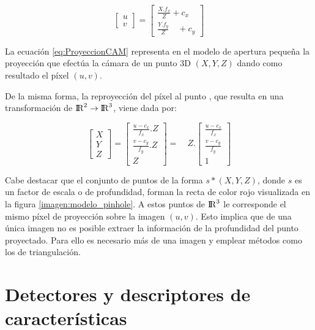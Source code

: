 \begin{equation}
\left[ \begin{matrix} u \\ v \end{matrix} \right] =\left[ \begin{matrix} \frac { X.{ f }_{ x } }{ Z } +{ c }_{ x } \\ \frac { Y.{ f }_{ y } }{ Z } \quad +{ c }_{ y } \end{matrix} \right] 
\label{eq:ProyeccionCAM} 
\end{equation}

La ecuación \ref{eq:ProyeccionCAM} representa en el modelo de apertura pequeña la proyección que efectúa la cámara de un punto 3D $(X, Y, Z)$ dando como resultado el píxel $(u, v)$.

De la misma forma, la reproyección del píxel al punto , que resulta en una transformación de ${\rm I\!R}^2 \to {\rm I\!R}^3$, viene dada por:

\begin{equation}
\left[ \begin{matrix} X \\ Y \\ Z \end{matrix} \right] =\left[ \begin{matrix} \frac { u-{ c }_{ x } }{ { f }_{ x } } .Z \\ \frac { v-{ c }_{ y } }{ { f }_{ y } } .Z \\ Z \end{matrix} \right] =\quad Z.\left[ \begin{matrix} \frac { u-{ c }_{ x } }{ { f }_{ x } }  \\ \frac { v-{ c }_{ y } }{ { f }_{ y } }  \\ 1 \end{matrix} \right]  
\label{eq:ReproyeccionCAM} 
\end{equation}

Cabe destacar que el conjunto de puntos de la forma $s*(X, Y, Z)$, donde $s$ es un factor de escala o de profundidad, forman la recta de color rojo visualizada en la figura \ref{imagen:modelo_pinhole}. A estos puntos de ${\rm I\!R}^3$ le corresponde el mismo píxel de proyección sobre la imagen $(u, v)$. Esto implica que de una única imagen no es posible extraer la información de la profundidad del punto proyectado. Para ello es necesario más de una imagen y emplear métodos como los de triangulación.


%
\section{Detectores y descriptores de características}

